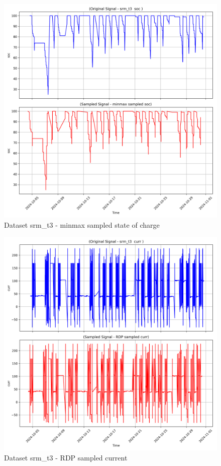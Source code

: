 \begin{figure}
    \centering
    \includegraphics[width=1\linewidth]{screenshots/srm_t3/minmax_sampled_soc_screenshot.png}
    \caption{Dataset srm\_t3 - minmax sampled state of charge }
    \label{fig:srm_t3_minmax_sampled_soc_screenshot}
\end{figure}
\begin{figure}
    \centering
    \includegraphics[width=1\linewidth]{screenshots/srm_t3/RDP_sampled_curr_screenshot.png}
    \caption{Dataset srm\_t3 - RDP sampled current }
    \label{fig:srm_t3_RDP_sampled_curr_screenshot}
\end{figure}
